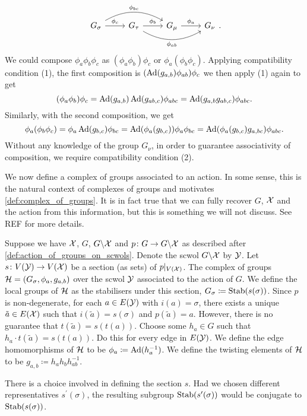 \[
	\begin{tikzcd}
		G_\sigma \ar[r, "\phi_c"] \ar[rr, bend left, "\phi_{bc}"] & G_\tau \ar[r, "\phi_b"] \ar[rr, bend right, "\phi_{ab}"'] & G_\mu \ar[r, "\phi_a"] & G_\nu
	\end{tikzcd}
	.\]
We could compose $\phi_a\phi_b\phi_c$ as $(\phi_a\phi_b)\phi_c$ or $\phi_a(\phi_b\phi_c)$.
Applying compatibility condition (1), the first composition is $(\operatorname{Ad}(g_{a,b})\phi_{ab})\phi_c$ we then apply (1) again to get
\[
	(\phi_a\phi_b)\phi_c = \operatorname{Ad}(g_{a,b})\operatorname{Ad}(g_{ab,c})\phi_{abc} = \operatorname{Ad}(g_{a,b}g_{ab,c})\phi_{abc}
	.\]
Similarly, with the second composition, we get
\[
	\phi_a(\phi_b\phi_c) = \phi_a\operatorname{Ad}(g_{b,c})\phi_{bc} = \operatorname{Ad}(\phi_a(g_{b,c}))\phi_a\phi_{bc} = \operatorname{Ad}(\phi_a(g_{b,c})g_{a,bc})\phi_{abc}
	.\]
Without any knowledge of the group $G_\nu$, in order to guarantee associativity of composition, we require compatibility condition (2).

We now define a complex of groups associated to an action.
In some sense, this is the natural context of complexes of groups and motivates  \cref{def:complex_of_groups}.
It is in fact true that we can fully recover $G$, $\mathcal{X}$ and the action from this information, but this is something we will not discuss.
See REF for more details.
\begin{definition}
	Suppose we have $\mathcal{X}$, $G$, $G \backslash \mathcal{X}$ and $p \colon G \to G \backslash \mathcal{X}$ as described after \cref{def:action_of_groups_on_scwols}.
	Denote the scwol $G \backslash \mathcal{X}$ by $\mathcal{Y}$.
	Let $s \colon V(\mathcal{Y}) \to V(\mathcal{X})$ be a section (as sets) of $p|_{V(\mathcal{X})}$.
	The complex of groups $\mathcal{H} = (G_\sigma, \phi_a, g_{a,b})$ over the scwol $\mathcal{Y}$ associated to the action of $G$.
	We define the local groups of $\mathcal{H}$ as the stabilisers under this section, $G_\sigma \coloneqq \operatorname{Stab}(s(\sigma))$.
	Since $p$ is non-degenerate, for each $a \in E(\mathcal{Y})$ with $i(a) = \sigma$, there exists a unique $\tilde{a} \in E(\mathcal{X})$ such that $i(\tilde{a}) = s(\sigma)$ and $p(\tilde{a}) = a$.
	However, there is no guarantee that $t(\tilde{a}) = s(t(a))$.
	Choose some $h_a \in G$ such that $h_a \cdot t(\tilde{a}) = s(t(a))$.
	Do this for every edge in $E(\mathcal{Y})$.
	We define the edge homomorphisms of $\mathcal{H}$ to be $\phi_a \coloneqq \operatorname{Ad}(h_a^{-1})$.
	We define the twisting elements of $\mathcal{H}$ to be $g_{a,b} \coloneq h_ah_bh_{ab}^{-1}$.
	\label{def:complex_of_groups_from_action}
\end{definition}

There is a choice involved in defining the section $s$.
Had we chosen different representatives $s^\prime(\sigma)$, the resulting  subgroup $\operatorname{Stab}(s^\prime(\sigma))$ would be conjugate to $\operatorname{Stab}(s(\sigma))$.

